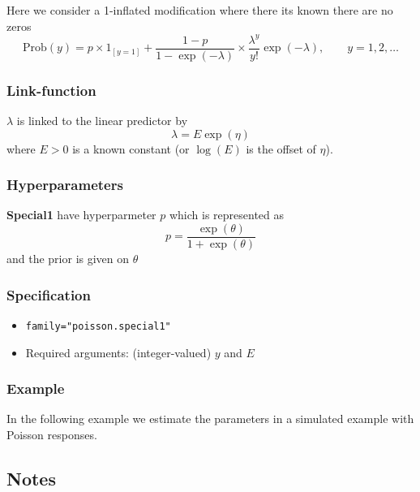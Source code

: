 \documentclass[a4paper,11pt]{article}
\begin{document}
\begin{description}
    \item
Here we consider a 1-inflated modification where there its known there
are no zeros
\begin{displaymath}
    \text{Prob}(y) = 
      p \times 1_{[y=1]} + \frac{1-p}{1-\exp(-\lambda)}
 \times
      \frac{\lambda^{y}}{y!}\exp(-\lambda), \qquad y=1, 2, \ldots
\end{displaymath}

\subsubsection*{Link-function}

$\lambda$ is linked to the linear predictor by
\begin{displaymath}
    \lambda = E \exp(\eta)
\end{displaymath}
where $E>0$ is a known constant (or $\log(E)$ is the offset of $\eta$).

\subsubsection*{Hyperparameters}

\textbf{Special1} have hyperparmeter $p$ which is represented as
\begin{displaymath}
    p = \frac{\exp(\theta)}{1+\exp(\theta)}
\end{displaymath}
and the prior is given on $\theta$




\subsubsection*{Specification}

\begin{itemize}
\item \texttt{family="poisson.special1"}
\item Required arguments: (integer-valued) $y$ and $E$
\end{itemize}

\subsubsection*{Example}

In the following example we estimate the parameters in a simulated
example with Poisson responses.


\end{description}


\subsection*{Notes}
\end{document}
